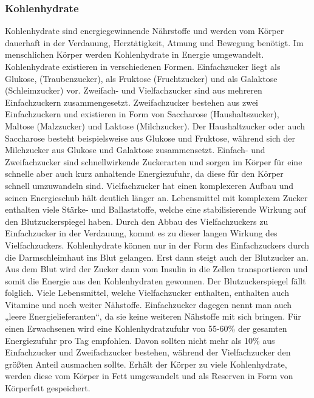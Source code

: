\documentclass[a4paper,11pt]{article}%
\renewcommand{\\}{\vspace*{0.5\baselineskip} \newline}
\begin{document}
	\subsubsection{Kohlenhydrate}
		Kohlenhydrate sind energiegewinnende Nährstoffe und werden vom Körper dauerhaft in der Verdauung, Herztätigkeit, Atmung und Bewegung benötigt.\cite{SG} Im menschlichen Körper werden Kohlenhydrate in Energie umgewandelt. Kohlenhydrate existieren in verschiedenen Formen. Einfachzucker liegt als Glukose, (Traubenzucker), als Fruktose (Fruchtzucker) und als Galaktose (Schleimzucker) vor. Zweifach- und Vielfachzucker sind aus mehreren Einfachzuckern zusammengesetzt. Zweifachzucker bestehen aus zwei Einfachzuckern und existieren in Form von Saccharose (Haushaltszucker), Maltose (Malzzucker) und Laktose (Milchzucker).\cite{ND} Der Haushaltzucker oder auch Saccharose besteht beispielsweise aus Glukose und Fruktose, während sich der Milchzucker aus Glukose und Galaktose zusammensetzt.\cite{SG} Einfach- und Zweifachzucker sind schnellwirkende Zuckerarten und sorgen im Körper für eine schnelle aber auch kurz anhaltende Energiezufuhr, da diese für den Körper schnell umzuwandeln sind. Vielfachzucker hat einen komplexeren Aufbau und seinen Energieschub hält deutlich länger an. Lebensmittel mit komplexem Zucker enthalten viele Stärke- und Ballaststoffe, welche eine stabilisierende Wirkung auf den Blutzuckerspiegel haben. Durch den Abbau des Vielfachzuckers zu Einfachzucker in der Verdauung, kommt es zu dieser langen Wirkung des Vielfachzuckers.\cite{ND} Kohlenhydrate können nur in der Form des Einfachzuckers durch die Darmschleimhaut ins Blut gelangen. Erst dann steigt auch der Blutzucker an. Aus dem Blut wird der Zucker dann vom Insulin in die Zellen transportieren und somit die Energie aus den Kohlenhydraten gewonnen. Der Blutzuckerspiegel fällt folglich.\cite{SG} \newline
		Viele Lebensmittel, welche Vielfachzucker enthalten, enthalten auch Vitamine und noch weiter Nähstoffe. Einfachzucker dagegen nennt man auch „leere Energielieferanten“, da sie keine weiteren Nähstoffe mit sich bringen. Für einen Erwachsenen wird eine Kohlenhydratzufuhr von 55-60\% der gesamten Energiezufuhr pro Tag empfohlen. Davon sollten nicht mehr als 10\% aus Einfachzucker und Zweifachzucker bestehen, während der Vielfachzucker den größten Anteil ausmachen sollte. \newline
		Erhält der Körper zu viele Kohlenhydrate, werden diese vom Körper in Fett umgewandelt und als Reserven in Form von Körperfett gespeichert.\cite{ND} \newline
\end{document}

